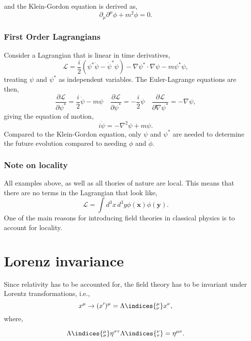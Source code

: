 and the Klein-Gordon equation is derived as,
\begin{equation}
  \partial_\mu \partial^\mu \phi + m^2\phi = 0. 
\end{equation}

\subsubsection{First Order Lagrangians}
Consider a Lagrangian that is linear in time derivatives, 
\begin{equation}
  \mathcal{L} = \frac{i}{2}(\psi^*\dot\psi - \dot\psi^*\psi) - \nabla\psi^*\cdot\nabla\psi - m\psi^*\psi,
\end{equation}
treating $\psi$ and $\psi^*$ as independent variables. The Euler-Lagrange equations are then,
\begin{equation}
  \frac{\partial\mathcal{L}}{\partial\psi^*} = \frac{i}{2}\dot\psi - m\psi \quad \frac{\partial\mathcal{L}}{\partial\psi^*} = -\frac{i}{2}\psi \quad \frac{\partial\mathcal{L}}{\partial\nabla\psi^*} = -\nabla\psi,
\end{equation}
giving the equation of motion, 
\begin{equation}
  i\dot\psi = -\nabla^2\psi +m\psi.
\end{equation}
Compared to the Klein-Gordon equation, only $\psi$ and $\psi^*$ are needed to determine the future evolution compared to needing $\phi$ and $\dot\phi$.

\subsubsection{Note on locality}
All examples above, as well as all thories of nature are local. This means that there are no terms in the Lagrangian that look like, 
\begin{equation}
  \mathcal{L} = \int d^3x\,d^3y\phi(\mathbf{x})\phi(\mathbf{y}). 
\end{equation}
One of the main reasons for introducing field theories in classical physics is to account for locality.

\section{Lorenz invariance}

Since relativity has to be accounted for, the field theory has to be invariant under Lorentz transformations, i.e., 
\begin{equation}
  x^\mu \rightarrow (x')^{\mu} = \Lambda\indices{^\mu_\nu}x^\nu,
\end{equation}
where, 
\begin{lemma}
  \begin{equation}\label{eq:lorentz}
    \Lambda\indices{^\mu_\sigma}\eta^{\sigma\tau}\Lambda\indices{^\nu_\tau} = \eta^{\mu\nu}.
  \end{equation}
  \vspace{-0.5cm}
\end{lemma}

